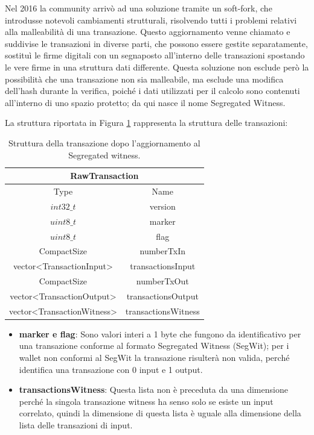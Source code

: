 Nel 2016 la community arrivò ad una soluzione tramite un soft-fork, che introdusse notevoli cambiamenti strutturali, risolvendo tutti i problemi relativi alla malleabilità di una transazione. Questo aggiornamento venne chiamato  e suddivise le transazioni in diverse parti, che possono essere gestite separatamente, sostituì le firme digitali con un segnaposto all’interno delle transazioni spostando le vere firme in una struttura dati differente. Questa soluzione non esclude però la possibilità che una transazione non sia malleabile, ma esclude una modifica dell’hash durante la verifica, poiché i dati utilizzati per il calcolo sono contenuti all’interno di uno spazio protetto; da qui nasce il nome Segregated Witness.

La struttura riportata in Figura \ref{tab:rawtxbitcoinc} rappresenta la struttura delle transazioni:

\begin{table}
       \centering\small
           \begin{tabular}{|c|c|}
               \hline
                 \multicolumn{2}{|c|}{\textbf{RawTransaction}} \\
                 \hline
                 \multicolumn{1}{|c|}{Type} & \multicolumn{1}{c|}{Name} \\
               \hline \hline
               $int32\_t$ & version   \\
               \hline
               $uint8\_t$ & marker \\
               \hline
               $uint8\_t$ & flag \\
               \hline
               CompactSize & numberTxIn \\
               \hline
               vector<TransactionInput> & transactionsInput \\
               \hline
               CompactSize & numberTxOut \\
               \hline
               vector<TransactionOutput> & transactionsOutput \\
               \hline
               vector<TransactionWitness> & transactionsWitness \\
               \hline
       \end{tabular}
       \caption{Struttura della transazione dopo l’aggiornamento al Segregated witness.\label{tab:rawtxbitcoinc}}
   \end{table}

\begin{itemize}
  \item {\bf marker e flag\/}: Sono valori interi a 1 byte che fungono da identificativo per una transazione conforme al formato Segregated Witness (SegWit); per i wallet non conformi al SegWit la transazione risulterà non valida, perché identifica una transazione con 0 input e 1 output.
  \item {\bf transactionsWitness\/}: Questa lista non è preceduta da una dimensione perché la singola transazione witness ha senso solo se esiste un input correlato, quindi la dimensione di questa lista è uguale alla dimensione della lista delle transazioni di input.
\end{itemize}

